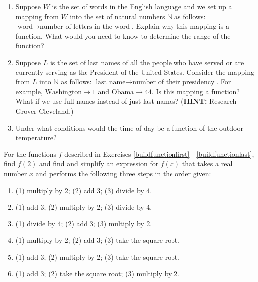 \documentclass{ximera}
\begin{document}
\begin{enumerate}

\setcounter{enumi}{\value{HW}}

\item    Suppose $W$ is the set of words in the English language and we set up a mapping from $W$ into the set of natural numbers $\mathbb{N}$ as follows: $\text{word} \rightarrow \text{number of letters in the word}$.  Explain why this mapping is a function.  What would you need to know to determine the range of the function?

\item  Suppose $L$ is the set of last names of all the people who have served or are currently serving as the President of the United States.   Consider the mapping from $L$ into $\mathbb{N}$ as follows:  $\text{last name} \rightarrow \text{number of their presidency}$.  For example,  $\text{Washington} \rightarrow 1$ and $\text{Obama} \rightarrow 44$.  Is this mapping a function?  What if we use full names instead of just last names? (\textbf{HINT:}  Research Grover Cleveland.)

\item  Under what conditions would the time of day be a function of the outdoor temperature?

\setcounter{HW}{\value{enumi}}

\end{enumerate}


For the functions $f$ described in Exercises \ref{buildfunctionfirst} - \ref{buildfunctionlast}, find $f(2)$ and find and simplify an expression for $f(x)$ that takes a real number $x$ and performs the following three steps in the order given: 


\begin{enumerate}
\setcounter{enumi}{\value{HW}}

\item  (1) multiply by 2; (2) add 3; (3) divide by 4. \label{buildfunctionfirst}

\item  (1) add 3; (2) multiply by 2; (3) divide by 4. 

\item (1) divide by 4; (2) add 3; (3) multiply by 2.

\item (1) multiply by 2; (2) add 3; (3) take the square root.

\item  (1) add 3; (2) multiply by 2; (3) take the square root.

\item  (1) add 3; (2) take the square root; (3) multiply by 2.  \label{buildfunctionlast}

\setcounter{HW}{\value{enumi}}
\end{enumerate}
\end{document}
